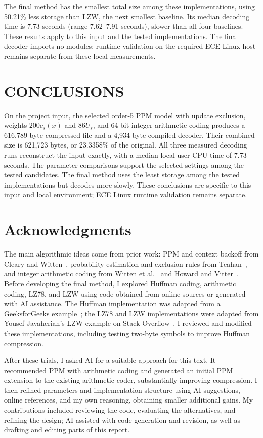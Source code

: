 \documentclass[12pt,onecolumn]{article}
\begin{document}
The final method has the smallest total size among these implementations,
using 50.21\% less storage than LZW, the next smallest baseline.
Its median decoding time is 7.73 seconds (range 7.62--7.91 seconds), slower
than all four baselines. These results apply to this input and the tested
implementations. The final decoder imports no modules; runtime validation
on the required ECE Linux host remains separate from these local measurements.
\FloatBarrier

\section{CONCLUSIONS}

On the project input, the selected order-5 PPM model with update exclusion,
weights $200c_s(x)$ and $86U_s$, and 64-bit integer arithmetic coding produces
a 616,789-byte compressed file and a 4,934-byte compiled decoder. Their
combined size is 621,723 bytes, or 23.3358\% of the original. All three
measured decoding runs reconstruct the input exactly, with a median local
user CPU time of 7.73 seconds. The parameter comparisons support the
selected settings among the tested candidates. The final method
uses the least storage among the tested implementations but decodes more
slowly. These conclusions are specific to this input and local environment;
ECE Linux runtime validation remains separate.

\section{Acknowledgments}

The main algorithmic ideas come from prior work: PPM and context backoff
from Cleary and Witten~\cite{cleary1984}, probability estimation and exclusion
rules from Teahan~\cite{teahan1995}, and integer arithmetic coding from
Witten et al.~\cite{witten1987} and Howard and Vitter~\cite{howard1992}.
Before developing the final method, I explored Huffman coding, arithmetic
coding, LZ78, and LZW using code obtained from online sources or generated
with AI assistance. The Huffman implementation was adapted from a
GeeksforGeeks example~\cite{gfg-code}; the LZ78 and LZW implementations were
adapted from Yousef Javaherian's LZW example on Stack Overflow~\cite{so-code}.
I reviewed and modified these implementations, including testing two-byte
symbols to improve Huffman compression.

After these trials, I asked AI for a suitable approach for this text.
It recommended PPM with arithmetic coding and generated an initial PPM
extension to the existing arithmetic coder, substantially improving
compression. I then refined parameters and implementation structure using
AI suggestions, online references, and my own reasoning, obtaining smaller
additional gains. My contributions included reviewing the code, evaluating
the alternatives, and refining the design; AI assisted with code generation
and revision, as well as drafting and editing parts of this report.
\end{document}
